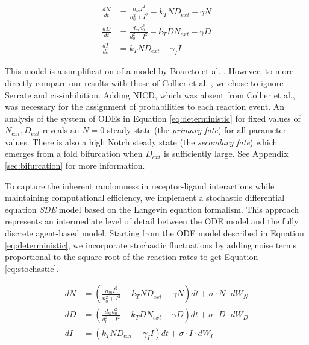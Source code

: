 \documentclass{article}
\begin{document}
\begin{flushleft}
\begin{equation}
\begin{aligned}
  \frac{dN}{dt} &= \frac{n_{m}I^2}{n_{0}^2 + I^2} - k_{T}ND_{ext} - \gamma N \\[5pt]
  \frac{dD}{dt} &= \frac{d_{m}d_{0}^2}{d_{0}^2 + I^2} - k_{T}DN_{ext} - \gamma D \\[5pt]
  \frac{dI}{dt} &= k_{T}ND_{ext} - \gamma_{I}I
\end{aligned}
\label{eq:deterministic}
\end{equation}

This model is a simplification of a model by Boareto et al. \cite{boareto_jaggeddelta_2015}.
However, to more directly compare our results with those of Collier et al. \cite{collier_pattern_1996}, we chose to ignore Serrate and cis-inhibition.
Adding NICD, which was absent from Collier et al., was necessary for the assignment of probabilities to each reaction event.
An analysis of the system of ODEs in Equation \ref{eq:deterministic} for fixed values of $N_{ext}, D_{ext}$ reveals an $N = 0$ steady state (the \emph{primary fate}) for all parameter values.
There is also a high Notch steady state (the \emph{secondary fate}) which emerges from a fold bifurcation when $D_{ext}$ is sufficiently large.
See Appendix \ref{sec:bifurcation} for more information.

\medskip

To capture the inherent randomness in receptor-ligand interactions while maintaining computational efficiency, we implement a stochastic differential equation \emph{SDE} model based on the Langevin equation formalism.
This approach represents an intermediate level of detail between the ODE model and the fully discrete agent-based model.
Starting from the ODE model described in Equation \ref{eq:deterministic}, we incorporate stochastic fluctuations by adding noise terms proportional to the square root of the reaction rates to get Equation \ref{eq:stochastic}.

\begin{equation}
\begin{aligned}
  dN &= \left( \frac{n_{m}I^2}{n_{0}^2 + I^2} - k_{T}ND_{ext} - \gamma N \right) dt + \sigma \cdot N \cdot dW_{N} \\[5pt]
  dD &= \left( \frac{d_{m}d_{0}^2}{d_{0}^2 + I^2} - k_{T}DN_{ext} - \gamma D \right)  dt + \sigma \cdot D \cdot dW_{D}  \\[5pt]
  dI &= \left( k_{T}ND_{ext} - \gamma_{I}I \right) dt + \sigma \cdot I \cdot dW_{I}
\end{aligned}
\label{eq:stochastic}
\end{equation}


\end{flushleft}
\end{document}
